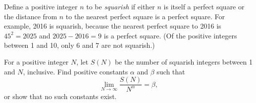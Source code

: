 Define a positive integer $n$ to be \emph{squarish} if either $n$ is itself a perfect square or the distance from $n$ to the nearest perfect square is a perfect square. For example, 2016 is squarish, because the nearest perfect square to 2016 is $45^2 = 2025$ and $2025-2016=9$ is a perfect square. (Of the positive integers between 1 and 10, only 6 and 7 are not squarish.)

For a positive integer $N$, let $S(N)$ be the number of squarish integers between 1 and $N$,
inclusive. Find positive constants $\alpha$ and $\beta$ such that
\[
\lim_{N \to \infty} \frac{S(N)}{N^\alpha} = \beta,
\]
or show that no such constants exist.
